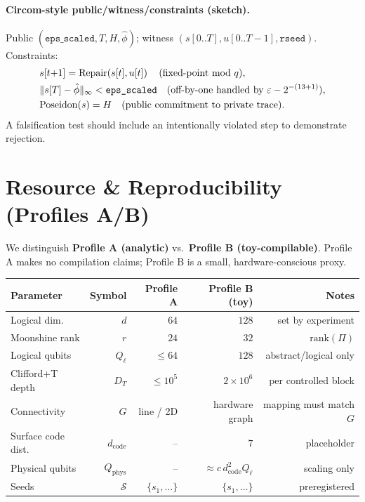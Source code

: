 \documentclass[11pt]{article}
\DeclarePairedDelimiter{\norm}{\lVert}{\rVert}
\newcommand{\rank}{\mathrm{rank}}
\newcommand{\fixbits}{13}
\newcommand{\dq}{2^{-(\fixbits+1)}}     %
\newcommand{\epsprime}{\varepsilon - \dq}
\theoremstyle{plain}
\theoremstyle{definition}
\theoremstyle{remark}
\begin{document}
\paragraph{Circom-style public/witness/constraints (sketch).}
Public $(\texttt{eps\_scaled},T,H,\hat\phi)$; witness $(s[0..T],u[0..T-1],\texttt{rseed})$. Constraints:
\[
\begin{aligned}
& s[t{+}1]=\mathrm{Repair}\!\left(s[t],u[t]\right) \quad \text{(fixed-point mod $q$)},\\
& \norm{s[T]-\hat\phi}_\infty < \texttt{eps\_scaled} \quad \text{(off-by-one handled by $\epsprime$)},\\
& \mathrm{Poseidon}(s)=H \quad \text{(public commitment to private trace)}.
\end{aligned}
\]
A falsification test should include an intentionally violated step to demonstrate rejection.

\section{Resource \& Reproducibility (Profiles A/B)}
\label{sec:resources}
We distinguish \textbf{Profile A (analytic)} vs.\ \textbf{Profile B (toy-compilable)}. Profile A makes no compilation claims; Profile B is a small, hardware-conscious proxy.

\begin{center}
\begin{tabular}{lrrrr}
\toprule
Parameter & Symbol & Profile A & Profile B (toy) & Notes \\
\midrule
Logical dim. & $d$ & $64$ & $128$ & set by experiment \\
Moonshine rank & $r$ & $24$ & $32$ & $\rank(\Pi)$ \\
Logical qubits & $Q_\ell$ & $\le 64$ & $128$ & abstract/logical only \\
Clifford+T depth & $D_T$ & $\le 10^5$ & $2\times 10^6$ & per controlled block \\
Connectivity & $G$ & line / 2D & hardware graph & mapping must match $G$ \\
Surface code dist. & $d_{\mathrm{code}}$ & -- & $7$ & placeholder \\
Physical qubits & $Q_{\mathrm{phys}}$ & -- & $\approx c\, d_{\mathrm{code}}^2 Q_\ell$ & scaling only \\
Seeds & $\mathcal{S}$ & $\{s_1,\dots\}$ & $\{s_1,\dots\}$ & preregistered \\
\bottomrule
\end{tabular}
\end{center}
\end{document}
